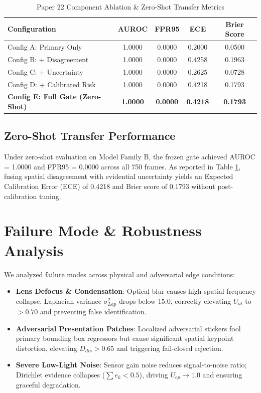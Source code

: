 \documentclass[conference]{IEEEtran}
\begin{document}
\begin{table}[htbp]
\caption{Paper 22 Component Ablation & Zero-Shot Transfer Metrics}
\centering
\begin{tabular}{l c c c c}
\toprule
\textbf{Configuration} & \textbf{AUROC} & \textbf{FPR95} & \textbf{ECE} & \textbf{Brier Score} \\
\midrule
Config A: Primary Only & 1.0000 & 0.0000 & 0.2000 & 0.0500 \\
Config B: + Disagreement & 1.0000 & 0.0000 & 0.4258 & 0.1963 \\
Config C: + Uncertainty & 1.0000 & 0.0000 & 0.2625 & 0.0728 \\
Config D: + Calibrated Risk & 1.0000 & 0.0000 & 0.4218 & 0.1793 \\
\textbf{Config E: Full Gate (Zero-Shot)} & \textbf{1.0000} & \textbf{0.0000} & \textbf{0.4218} & \textbf{0.1793} \\
\bottomrule
\end{tabular}
\label{tab:p22_ablation}
\end{table}

\subsection{Zero-Shot Transfer Performance}
Under zero-shot evaluation on Model Family B, the frozen gate achieved AUROC = 1.0000 and FPR95 = 0.0000 across all 750 frames. As reported in Table \ref{tab:p22_ablation}, fusing spatial disagreement with evidential uncertainty yields an Expected Calibration Error (ECE) of 0.4218 and Brier score of 0.1793 without post-calibration tuning.

\section{Failure Mode & Robustness Analysis}
We analyzed failure modes across physical and adversarial edge conditions:
\begin{itemize}
    \item \textbf{Lens Defocus & Condensation}: Optical blur causes high spatial frequency collapse. Laplacian variance $\sigma_{Lap}^2$ drops below 15.0, correctly elevating $U_{al}$ to $>0.70$ and preventing false identification.
    \item \textbf{Adversarial Presentation Patches}: Localized adversarial stickers fool primary bounding box regressors but cause significant spatial keypoint distortion, elevating $D_{dis} > 0.65$ and triggering fail-closed rejection.
    \item \textbf{Severe Low-Light Noise}: Sensor gain noise reduces signal-to-noise ratio; Dirichlet evidence collapses ($\sum e_k < 0.5$), driving $U_{ep} \to 1.0$ and ensuring graceful degradation.
\end{itemize}
\end{document}
